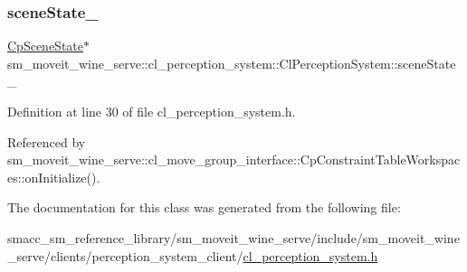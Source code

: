 \subsubsection{\texorpdfstring{scene\+State\+\_\+}{sceneState\_}}
{\footnotesize\ttfamily \hyperlink{classsm__moveit__wine__serve_1_1cl__perception__system_1_1CpSceneState}{Cp\+Scene\+State}$\ast$ sm\+\_\+moveit\+\_\+wine\+\_\+serve\+::cl\+\_\+perception\+\_\+system\+::\+Cl\+Perception\+System\+::scene\+State\+\_\+}



Definition at line 30 of file cl\+\_\+perception\+\_\+system.\+h.



Referenced by sm\+\_\+moveit\+\_\+wine\+\_\+serve\+::cl\+\_\+move\+\_\+group\+\_\+interface\+::\+Cp\+Constraint\+Table\+Workspaces\+::on\+Initialize().



The documentation for this class was generated from the following file\+:\begin{DoxyCompactItemize}
\item 
smacc\+\_\+sm\+\_\+reference\+\_\+library/sm\+\_\+moveit\+\_\+wine\+\_\+serve/include/sm\+\_\+moveit\+\_\+wine\+\_\+serve/clients/perception\+\_\+system\+\_\+client/\hyperlink{sm__moveit__wine__serve_2include_2sm__moveit__wine__serve_2clients_2perception__system__client_2cl__perception__system_8h}{cl\+\_\+perception\+\_\+system.\+h}\end{DoxyCompactItemize}
